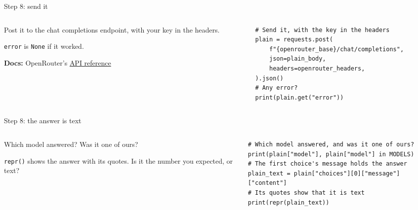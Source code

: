 \documentclass[9pt,aspectratio=169]{beamer}
\begin{document}
\begin{frame}[fragile]{Step 8: send it}
    \begin{columns}[T]
        \begin{column}{0.37\textwidth}
            Post it to the chat completions endpoint, with your key in the headers.

            \medskip
            \texttt{error} is \texttt{None} if it worked.

            \medskip
            {\scriptsize\textbf{Docs:} OpenRouter's \href{https://openrouter.ai/docs/api/reference/overview}{API reference}\par}
        \end{column}
        \begin{column}{0.6\textwidth}
\begin{lstlisting}
# Send it, with the key in the headers
plain = requests.post(
    f"{openrouter_base}/chat/completions",
    json=plain_body,
    headers=openrouter_headers,
).json()
# Any error?
print(plain.get("error"))
\end{lstlisting}
        \end{column}
    \end{columns}
\end{frame}

\begin{frame}[fragile]{Step 8: the answer is text}
    \begin{columns}[T]
        \begin{column}{0.37\textwidth}
            Which model answered? Was it one of ours?

            \medskip
            \texttt{repr()} shows the answer with its quotes. Is it the number you expected, or text?
        \end{column}
        \begin{column}{0.6\textwidth}
\begin{lstlisting}
# Which model answered, and was it one of ours?
print(plain["model"], plain["model"] in MODELS)
# The first choice's message holds the answer
plain_text = plain["choices"][0]["message"]["content"]
# Its quotes show that it is text
print(repr(plain_text))
\end{lstlisting}
        \end{column}
    \end{columns}
\end{frame}
\end{document}
